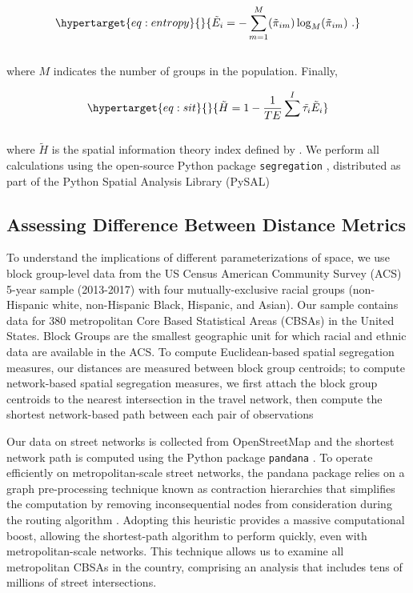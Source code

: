 \documentclass[
  10pt,
]{article}
\begin{document}
\begin{equation}\protect\hypertarget{eq:entropy}{}{
\tilde{E}_i = -\sum^M_{m=1}(\tilde{\pi}_{im})\log_M(\tilde{\pi}_{im}) \ .
}\label{eq:entropy}\end{equation}\\
where \(M\) indicates the number of groups in the population. Finally,

\begin{equation}\protect\hypertarget{eq:sit}{}{
\tilde{H} = 1-\frac{1}{TE} \sum^I \tilde{\tau_i}\tilde{E}_i
}\label{eq:sit}\end{equation}\\
where \(\tilde{H}\) is the spatial information theory index defined by
\citet{reardon2004MeasuresSpatial}. We perform all calculations using
the open-source Python package \texttt{segregation}
\citep{cortes2020OpensourceFramework}, distributed as part of the Python
Spatial Analysis Library (PySAL) \citep{rey2021PySALEcosystem}

\hypertarget{assessing-difference-between-distance-metrics}{%
\subsection{Assessing Difference Between Distance
Metrics}\label{assessing-difference-between-distance-metrics}}

To understand the implications of different parameterizations of space,
we use block group-level data from the US Census American Community
Survey (ACS) 5-year sample (2013-2017) with four mutually-exclusive
racial groups (non-Hispanic white, non-Hispanic Black, Hispanic, and
Asian). Our sample contains data for 380 metropolitan Core Based
Statistical Areas (CBSAs) in the United States. Block Groups are the
smallest geographic unit for which racial and ethnic data are available
in the ACS. To compute Euclidean-based spatial segregation measures, our
distances are measured between block group centroids; to compute
network-based spatial segregation measures, we first attach the block
group centroids to the nearest intersection in the travel network, then
compute the shortest network-based path between each pair of
observations

Our data on street networks is collected from OpenStreetMap and the
shortest network path is computed using the Python package
\texttt{pandana} \citep{foti2012GeneralizedComputational}. To operate
efficiently on metropolitan-scale street networks, the pandana package
relies on a graph pre-processing technique known as contraction
hierarchies that simplifies the computation by removing inconsequential
nodes from consideration during the routing algorithm
\citep{geisberger2012ExactRouting}. Adopting this heuristic provides a
massive computational boost, allowing the shortest-path algorithm to
perform quickly, even with metropolitan-scale networks. This technique
allows us to examine all metropolitan CBSAs in the country, comprising
an analysis that includes tens of millions of street intersections.
\end{document}
